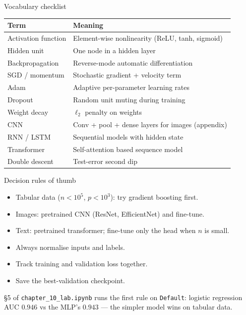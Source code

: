 \documentclass[aspectratio=169,11pt]{beamer}
\begin{document}
\begin{frame}{Vocabulary checklist}
  \footnotesize
  \begin{tabular}{ll}
    \toprule
    \textbf{Term} & \textbf{Meaning} \\
    \midrule
    Activation function & Element-wise nonlinearity (ReLU, tanh, sigmoid) \\
    Hidden unit & One node in a hidden layer \\
    Backpropagation & Reverse-mode automatic differentiation \\
    SGD / momentum & Stochastic gradient + velocity term \\
    Adam & Adaptive per-parameter learning rates \\
    Dropout & Random unit muting during training \\
    Weight decay & $\ell_2$ penalty on weights \\
    CNN & Conv + pool + dense layers for images (appendix) \\
    RNN / LSTM & Sequential models with hidden state \\
    Transformer & Self-attention based sequence model \\
    Double descent & Test-error second dip \\
    \bottomrule
  \end{tabular}
\end{frame}

\begin{frame}{Decision rules of thumb}
  \begin{itemize}
    \item Tabular data ($n < 10^5$, $p < 10^3$): try gradient
          boosting first.
    \item Images: pretrained CNN (ResNet, EfficientNet) and
          fine-tune.
    \item Text: pretrained transformer; fine-tune only the head when
          $n$ is small.
    \item Always normalise inputs and labels.
    \item Track training and validation loss together.
    \item Save the best-validation checkpoint.
  \end{itemize}
  \begin{labnote}
    \S5 of \texttt{chapter\_10\_lab.ipynb} runs the first rule on \texttt{Default}:
    logistic regression AUC $0.946$ vs the MLP's $0.943$ --- the simpler model wins
    on tabular data.
  \end{labnote}
\end{frame}
\end{document}
